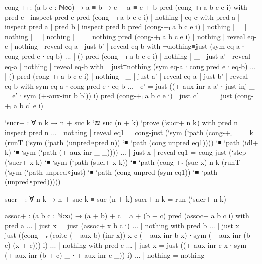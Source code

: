 \begin{code}[hide]
cong-+ₗ : (a b c : ℕ∞) → a ≡ b → c + a ≡ c + b
pred (cong-+ₗ a b c e i) with pred c | inspect pred c
pred (cong-+ₗ a b c e i) | nothing | eq-c with pred a | inspect pred a | pred b | inspect pred b
pred (cong-+ₗ a b c e i) | nothing | _           | nothing | _           | nothing | _ = nothing
pred (cong-+ₗ a b c e i) | nothing | reveal eq-c | nothing | reveal eq-a | just b' | reveal eq-b with ¬nothing≡just (sym eq-a ∙ cong pred e ∙ eq-b)
... | ()
pred (cong-+ₗ a b c e i) | nothing | _ | just a' | reveal eq-a | nothing | reveal eq-b with ¬just≡nothing (sym eq-a ∙ cong pred e ∙ eq-b)
... | ()
pred (cong-+ₗ a b c e i) | nothing | _ | just a' | reveal eq-a | just b' | reveal eq-b with sym eq-a ∙ cong pred e ∙ eq-b
... | e' = just ((+-aux-inr a a' ∙ just-inj _ _ e' ∙ sym (+-aux-inr b b')) i)
pred (cong-+ₗ a b c e i) | just c' | _ = just (cong-+ₗ a b c' e i)

`sucr+ : ∀ n k → n + suc k `≋ suc (n + k)
`prove (`sucr+ n k) with pred n | inspect pred n
... | nothing | reveal eq1 = cong-just (`sym (`path (cong-+ᵣ _ _ k (runT (`sym (`path (unpred∘pred {n})) `◾ `path (cong unpred eq1)))) `◾ `path (idl+ k) `◾ `sym (`path (+-aux-inr _ _))))
... | just x  | reveal eq1 = cong-just (`step (`sucr+ x k) `◾ `sym (`path (sucl+ x k)) `◾ `path (cong-+ᵣ (suc x) n k (runT (`sym (`path unpred∘just) `◾ `path (cong unpred (sym eq1)) `◾ `path (unpred∘pred)))))

sucr+ : ∀ n k → n + suc k ≡ suc (n + k)
sucr+ n k = run (`sucr+ n k)

assoc+ : (a b c : ℕ∞) → (a + b) + c ≡ a + (b + c)
pred (assoc+ a b c i) with pred a
... | just x = just (assoc+ x b c i)
... | nothing with pred b
... | just x = just ((cong-+ᵣ (coite (+-aux b) (inr x)) x c (+-aux-inr b x) ∙ sym (+-aux-inr (b + c) (x + c))) i)
... | nothing with pred c
... | just x = just ((+-aux-inr c x ∙ sym (+-aux-inr (b + c) _ ∙ +-aux-inr c _)) i)
... | nothing = nothing


\end{code}
